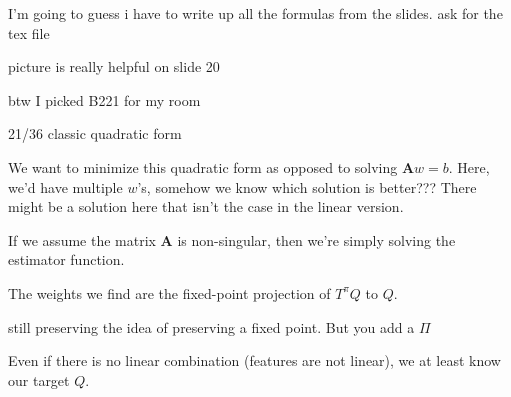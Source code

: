 \documentclass[11pt]{article}
\begin{document}
I'm going to guess i have to write up all the formulas from the slides.
ask for the tex file

picture is really helpful on slide 20

btw I picked B221 for my room

21/36
classic quadratic form

We want to minimize this quadratic form as opposed to solving $\boldsymbol{A}w = b$. Here, we'd have multiple $w$'s, somehow we know which solution is better??? There might be a solution here that isn't the case in the linear version.

If we assume the matrix $\boldsymbol{A}$ is non-singular, then we're simply solving the estimator function.


The weights we find are the fixed-point projection of $T^\pi Q$ to $Q$.


still preserving the idea of preserving a fixed point. But you add a $\Pi$

Even if there is no linear combination (features are not linear), we at least know our target $Q$.


\cite{LagoudakisParrLittman2002, LagoudakisParr2003}


\end{document}
